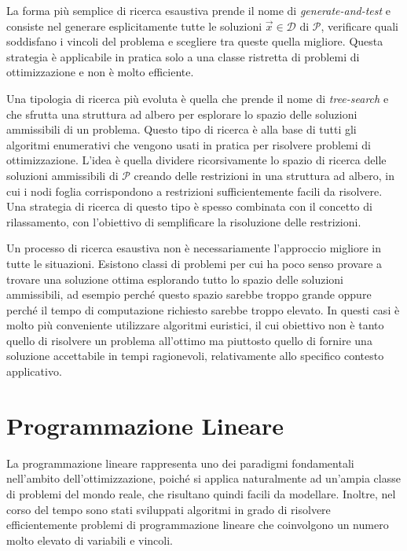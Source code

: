La forma più semplice di ricerca esaustiva prende il nome di
\textit{generate-and-test} e consiste nel generare esplicitamente tutte le
soluzioni $\vec{x} \in \mathcal{D}$ di $\mathcal{P}$, verificare quali
soddisfano i vincoli del problema e scegliere tra queste quella migliore.
Questa strategia è applicabile in pratica solo a una classe ristretta di
problemi di ottimizzazione e non è molto efficiente.

Una tipologia di ricerca più evoluta è quella che prende il nome di
\textit{tree-search} e che sfrutta una struttura ad albero per esplorare lo
spazio delle soluzioni ammissibili di un problema. Questo tipo di ricerca è
alla base di tutti gli algoritmi enumerativi che vengono usati in pratica
per risolvere problemi di ottimizzazione. L'idea è quella dividere
ricorsivamente lo spazio di ricerca delle soluzioni ammissibili di
$\mathcal{P}$ creando delle restrizioni in una struttura ad albero, in cui
i nodi foglia corrispondono a restrizioni sufficientemente facili da
risolvere. Una strategia di ricerca di questo tipo è spesso combinata con
il concetto di rilassamento, con l'obiettivo di semplificare la risoluzione
delle restrizioni.

Un processo di ricerca esaustiva non è necessariamente l'approccio migliore
in tutte le situazioni. Esistono classi di problemi per cui ha poco senso
provare a trovare una soluzione ottima esplorando tutto lo spazio delle
soluzioni ammissibili, ad esempio perché questo spazio sarebbe troppo
grande oppure perché il tempo di computazione richiesto sarebbe troppo
elevato.  In questi casi è molto più conveniente utilizzare algoritmi
euristici, il cui obiettivo non è tanto quello di risolvere un  problema
all'ottimo ma piuttosto quello di fornire una soluzione accettabile in
tempi ragionevoli, relativamente allo specifico contesto applicativo.

\section{Programmazione Lineare}
La programmazione lineare rappresenta uno dei paradigmi fondamentali
nell'ambito dell'ottimizzazione, poiché si applica naturalmente ad un'ampia
classe di problemi del mondo reale, che risultano quindi facili da
modellare. Inoltre, nel corso del tempo sono stati sviluppati algoritmi in
grado di risolvere efficientemente problemi di programmazione lineare che
coinvolgono un numero molto elevato di variabili e vincoli.

